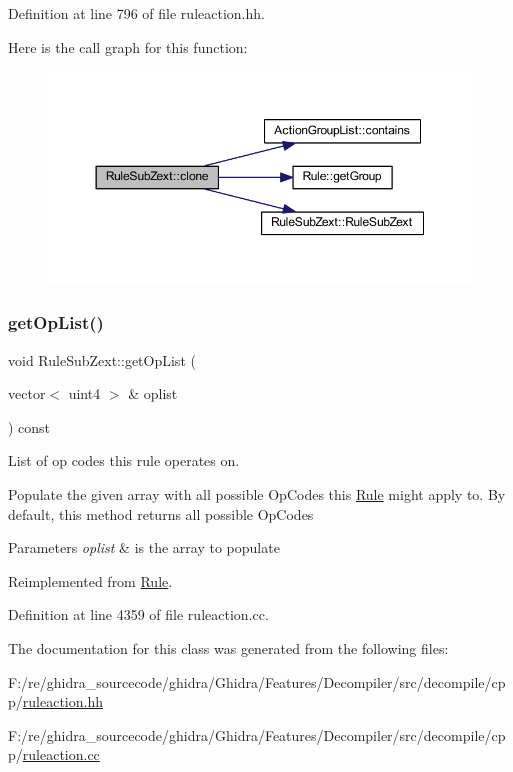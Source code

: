 Definition at line 796 of file ruleaction.\+hh.

Here is the call graph for this function\+:
\nopagebreak
\begin{figure}[H]
\begin{center}
\leavevmode
\includegraphics[width=350pt]{class_rule_sub_zext_af5aa330b8a18e0491fde11acef8fd853_cgraph}
\end{center}
\end{figure}
\mbox{\label{class_rule_sub_zext_a14a0365fedfc7c277e9387f2622d9c3b}} 
\subsubsection{\texorpdfstring{getOpList()}{getOpList()}}
{\footnotesize\ttfamily void Rule\+Sub\+Zext\+::get\+Op\+List (\begin{DoxyParamCaption}\item[{vector$<$ uint4 $>$ \&}]{oplist }\end{DoxyParamCaption}) const\hspace{0.3cm}{\ttfamily [virtual]}}



List of op codes this rule operates on. 

Populate the given array with all possible Op\+Codes this \mbox{\hyperlink{class_rule}{Rule}} might apply to. By default, this method returns all possible Op\+Codes 
\begin{DoxyParams}{Parameters}
{\em oplist} & is the array to populate \\
\hline
\end{DoxyParams}


Reimplemented from \mbox{\hyperlink{class_rule_a4023bfc7825de0ab866790551856d10e}{Rule}}.



Definition at line 4359 of file ruleaction.\+cc.



The documentation for this class was generated from the following files\+:\begin{DoxyCompactItemize}
\item 
F\+:/re/ghidra\+\_\+sourcecode/ghidra/\+Ghidra/\+Features/\+Decompiler/src/decompile/cpp/\mbox{\hyperlink{ruleaction_8hh}{ruleaction.\+hh}}\item 
F\+:/re/ghidra\+\_\+sourcecode/ghidra/\+Ghidra/\+Features/\+Decompiler/src/decompile/cpp/\mbox{\hyperlink{ruleaction_8cc}{ruleaction.\+cc}}\end{DoxyCompactItemize}
